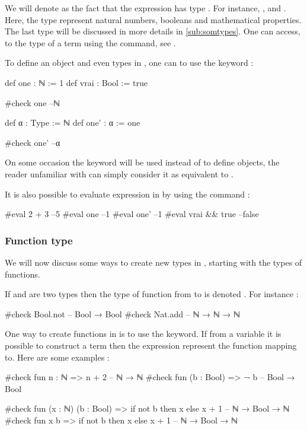   We will denote as  the fact that the expression  has type . For instance, ,  and . Here, the type  represent natural numbers,  booleans and  mathematical properties. The last type will be discussed in more details in \ref{sub:somtypes}. One can access, to the type of a term using the  command, see \editor.


To define an object and even types in \Lean, one can to use the  keyword :
\begin{leancode}
def one : ℕ := 1
def vrai : Bool := true

#check one --ℕ

def  α : Type := ℕ
def one' : α := one

#check one' --α
\end{leancode}


On some occasion the  keyword will be used instead of  to define objects, the reader unfamiliar with \Lean can simply consider it as equivalent to .

It is also possible to evaluate expression in \Lean by using the  command :
\begin{leancode}
#eval 2 + 3 --5
#eval one --1
#eval one' --1
#eval vrai && true --false
\end{leancode}

\subsubsection{Function type}
We will now discuss some ways to create new types in \Lean, starting with the types of functions. 

If  and  are two types then the type of function from  to  is denoted . For instance :
\begin{leancode}
#check Bool.not -- Bool → Bool 
#check Nat.add -- ℕ → ℕ → ℕ
\end{leancode}

One way to create functions in \Lean is to use the  keyword. If from a variable  it is possible to construct a term  then the expression  represent the function mapping  to. Here are some examples :
\begin{leancode}
#check fun n : ℕ => n + 2 -- ℕ → ℕ
#check fun (b : Bool) => ¬ b -- Bool → Bool

#check fun (x : ℕ) (b : Bool) => if not b then x else x + 1   -- ℕ → Bool → ℕ
#check fun x b => if not b then x else x + 1   -- ℕ → Bool → ℕ
\end{leancode}


